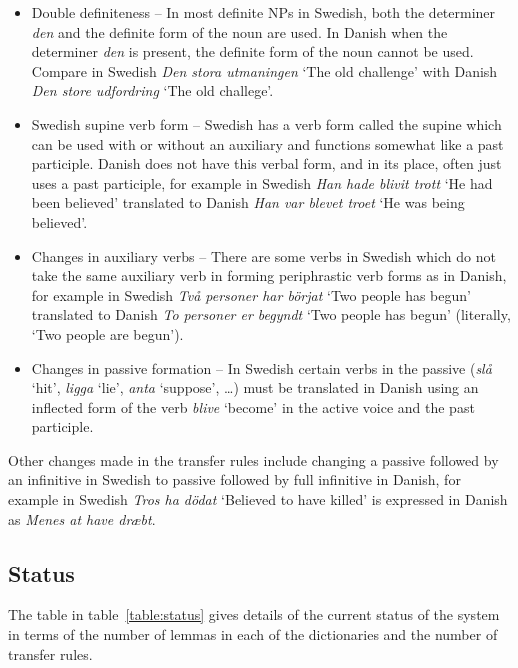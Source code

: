 \documentclass[11pt]{article}
\begin{document}
\begin{itemize}
  \item  Double definiteness -- In most definite NPs in Swedish, both the determiner \emph{den}
    and the definite form of the noun are used. In Danish when the determiner \emph{den} is 
    present, the definite form of the noun cannot be used. Compare in Swedish \emph{Den stora utmaningen}
    `The old challenge' with Danish \emph{Den store udfordring} `The old challege'.
  \item  Swedish supine verb form -- Swedish has a verb form called the supine which can be used with
    or without an auxiliary and functions somewhat like a past participle. Danish does not have this 
    verbal form, and in its place, often just uses a past participle, for example in Swedish 
    \emph{Han hade blivit trott} `He had been believed' translated to Danish \emph{Han var blevet troet} 
    `He was being believed'.
  \item  Changes in auxiliary verbs -- There are some verbs in Swedish which do not take the same 
    auxiliary verb in forming periphrastic verb forms as in Danish, for example in Swedish \emph{Två 
    personer har börjat} `Two people has begun' translated to Danish \emph{To personer er begyndt} 
    `Two people has begun' (literally, `Two people are begun').
  \item  Changes in passive formation -- In Swedish certain verbs in the passive (\emph{slå} `hit', 
    \emph{ligga} `lie', \emph{anta} `suppose', \ldots) must be translated in Danish using an inflected 
    form of the verb \emph{blive} `become' in the active voice and the past participle.
\end{itemize}

Other changes made in the transfer rules include changing a passive followed by an infinitive in Swedish
to passive followed by full infinitive in Danish, for example in Swedish \emph{Tros ha dödat} `Believed to have killed' is expressed in Danish as \emph{Menes at have dræbt}.

\subsection{Status}

The table in table~\ref{table:status} gives details of the current status of the system
in terms of the number of lemmas in each of the dictionaries and the number of transfer rules.
\end{document}
